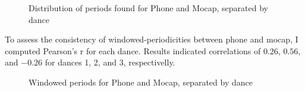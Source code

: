 \documentclass{article}
\begin{document}
\begin{figure}[t]
\noindent{}
\caption{Distribution of periods found for Phone and Mocap, separated by dance}
\centering
\end{figure}

To assess the consistency of windowed-periodicities between phone and mocap, I computed Pearson's r for each dance. Results indicated correlations of $0.26$, $0.56$, and $-0.26$ for dances 1, 2, and 3, respectivelly.

\begin{figure}[t]
\noindent{}
\caption{Windowed periods for Phone and Mocap, separated by dance}
\centering
\end{figure}
\end{document}
